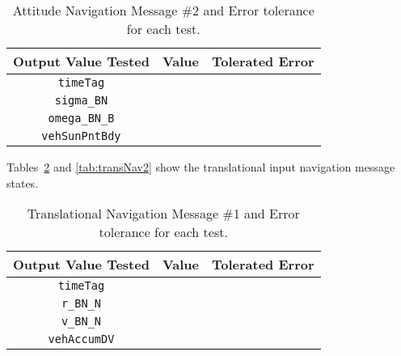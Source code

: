 \begin{table}[htbp]
	\caption{Attitude Navigation Message \#2 and Error tolerance for each test.}
	\label{tab:attNav2}
	\centering \fontsize{10}{10}\selectfont
	\begin{tabular}{ c | c | c } %
		\hline\hline
		\textbf{Output Value Tested} & \textbf{Value} & \textbf{Tolerated Error}  \\ 
		\hline
		{\tt timeTag}  &       & 	   \\ 
		{\tt sigma\_BN}  &       & 	   \\ 
		{\tt omega\_BN\_B}  &       & 	   \\ 
		{\tt vehSunPntBdy}  &       & 	   \\ 
		\hline\hline
	\end{tabular}
\end{table}


Tables~\ref{tab:transNav1} and \ref{tab:transNav2} show the translational input navigation message states.

\begin{table}[htbp]
	\caption{Translational Navigation Message \#1 and Error tolerance for each test.}
	\label{tab:transNav1}
	\centering \fontsize{10}{10}\selectfont
	\begin{tabular}{ c | c | c } %
		\hline\hline
		\textbf{Output Value Tested} & \textbf{Value} & \textbf{Tolerated Error}  \\ 
		\hline
		{\tt timeTag}  &       & 	   \\ 
		{\tt r\_BN\_N}  &       & 	   \\ 
		{\tt v\_BN\_N}  &       & 	   \\ 
		{\tt vehAccumDV}  &       & 	   \\ 
		\hline\hline
	\end{tabular}
\end{table}

